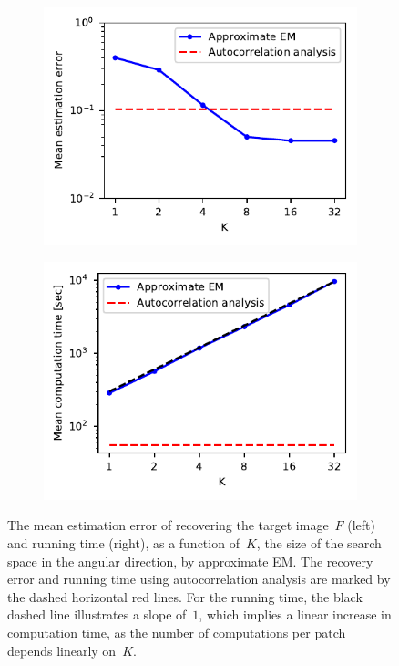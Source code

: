 \documentclass{article}
\begin{document}
\begin{figure}[!tb]
	\begin{subfigure}[ht]{\columnwidth}
		\centering
		\includegraphics[width=0.85\columnwidth]{figures/experiment_K_err.pdf}
	\end{subfigure}
	\hfill
	\begin{subfigure}[ht]{\columnwidth}
		\centering
		\includegraphics[width=0.85\columnwidth]{figures/experiment_K_time.pdf}
	\end{subfigure}
	\caption{The mean estimation error of recovering the target image~$F$ (left) and running time (right), as a function of~$K$, the size of the search space in the angular direction, by approximate EM. The recovery error and running time using autocorrelation analysis are marked by the dashed horizontal red lines. For the running time, the black dashed line illustrates a slope of~$1$, which implies a linear increase in computation time, as the number of computations per patch depends linearly on~$K$.}
\label{fig:discretization_experiment}
\end{figure}
\end{document}
